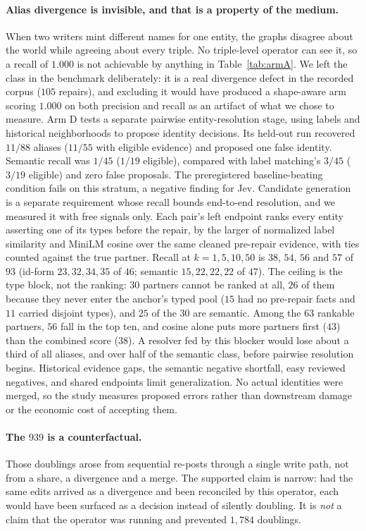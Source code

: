 \paragraph{Alias divergence is invisible, and that is a property of the medium.}
When two writers mint different names for one entity, the graphs disagree about
the world while agreeing about every triple. No triple-level operator can see
it, so a recall of $1.000$ is not achievable by anything in Table~\ref{tab:armA}.
We left the class in the benchmark deliberately: it is a real
divergence defect in the recorded corpus ($105$ repairs), and excluding it would have produced a
shape-aware arm scoring $1.000$ on both precision and recall as an artifact of
what we chose to measure. Arm D tests a separate pairwise entity-resolution stage, using labels and
historical neighborhoods to propose identity decisions. Its held-out run recovered
$11/88$ aliases ($11/55$ with eligible evidence) and proposed one false identity.
Semantic recall was $1/45$ ($1/19$ eligible), compared with label matching's
$3/45$ ($3/19$ eligible) and zero false proposals. The preregistered baseline-beating
condition fails on this stratum, a negative finding for Jev. Candidate generation
is a separate requirement whose recall bounds end-to-end resolution, and we
measured it with free signals only. Each pair's left endpoint ranks every entity
asserting one of its types before the repair, by the larger of normalized label
similarity and MiniLM cosine over the same cleaned pre-repair evidence, with ties
counted against the true partner. Recall at $k = 1, 5, 10, 50$ is $38$, $54$,
$56$ and $57$ of $93$ (id-form $23, 32, 34, 35$ of $46$; semantic
$15, 22, 22, 22$ of $47$). The ceiling is the type block, not the ranking:
$30$ partners cannot be ranked at all, $26$ of them because they never enter the
anchor's typed pool ($15$ had no pre-repair facts and $11$ carried disjoint
types), and $25$ of the $30$ are semantic. Among the $63$ rankable partners,
$56$ fall in the top ten, and cosine alone puts more partners first ($43$) than
the combined score ($38$). A resolver fed by this blocker would lose about a
third of all aliases, and over half of the semantic class, before pairwise
resolution begins. Historical evidence gaps, the semantic negative
shortfall, easy reviewed negatives, and shared endpoints limit generalization.
No actual identities were merged, so the study measures proposed errors rather
than downstream damage or the economic cost of accepting them.

\paragraph{The $939$ is a counterfactual.} Those doublings arose from sequential
re-posts through a single write path, not from a share, a divergence and a merge.
The supported claim is narrow: had the same edits arrived as a divergence and
been reconciled by this operator, each would have been surfaced as a decision
instead of silently doubling. It is \emph{not} a claim that the operator was
running and prevented $1{,}784$ doublings.

